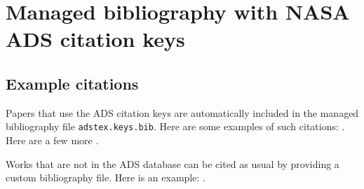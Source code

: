 \documentclass{article}
\begin{document}
\section*{Managed bibliography with NASA ADS citation keys} 



\subsection*{Example citations}
Papers that use the ADS citation keys are automatically included in the managed bibliography file \texttt{adstex.keys.bib}.
Here are some examples of such citations:
\cite{%
    1958ZA.....46..108B,%
    1962AJ.....67..471K,%
    1966AJ.....71...64K%
}. 
Here are a few more
\cite{2002Sci...295...82K,2003PASP..115..763C}. 

Works that are not in the ADS database can be cited as usual by providing a custom bibliography file. Here is an example: \cite{mcgrail2004}.




\end{document}
